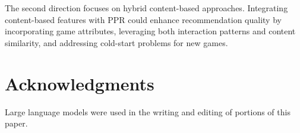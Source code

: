 \documentclass[conference,compsoc]{IEEEtran}
\begin{document}
The second direction focuses on hybrid content-based approaches. Integrating content-based features with PPR could enhance recommendation quality by incorporating game attributes, leveraging both interaction patterns and content similarity, and addressing cold-start problems for new games.

\section*{Acknowledgments}
Large language models were used in the writing and editing of portions of this paper.


\nocite{*}


\end{document}
